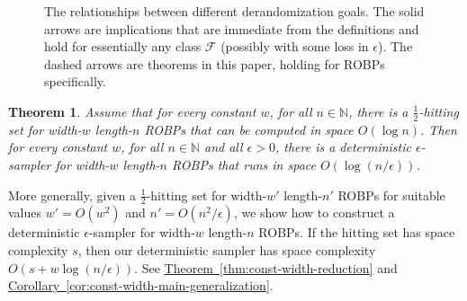 \documentclass[11pt]{article}
\numberwithin{equation}{section}
\newtheorem{theorem}{Theorem}[section]
\theoremstyle{definition}
\theoremstyle{plain}
\newcommand{\N}{\mathbb N}
\newcommand{\expref}[2]{\hyperref[#2]{#1~\ref{#2}}}
\DeclareMathOperator*{\ExpVal}{\mathbb{E}}
\begin{document}
\begin{figure}[h]
\begin{center}

\end{center}

\caption{The relationships between different derandomization goals. The solid arrows are implications that are immediate from the definitions and hold for essentially any class $\mathcal{F}$ (possibly with some loss in $\epsilon$). The dashed arrows are theorems in this paper, holding for ROBPs specifically.} \label{fig:implications}
\end{figure}

\begin{theorem} \label{thm:const-width-main}
Assume that for every constant $w$, for all $n \in \N$, there is a $\frac{1}{2}$-hitting set for width-$w$ length-$n$ ROBPs that can be computed in space $O(\log n)$. Then for every constant $w$, for all $n \in \N$ and all $\epsilon > 0$, there is a deterministic $\epsilon$-sampler for width-$w$ length-$n$ ROBPs that runs in space $O(\log(n/\epsilon))$.
\end{theorem}

More generally, given a $\frac{1}{2}$-hitting set for width-$w'$ length-$n'$ ROBPs for suitable values $w' = O(w^2)$ and $n' = O(n^2/\epsilon)$, we show how to construct a deterministic $\epsilon$-sampler for width-$w$ length-$n$ ROBPs. If the hitting set has space complexity $s$, then our deterministic sampler has space complexity $O(s + w \log(n/\epsilon))$. See \expref{Theorem}{thm:const-width-reduction} and \expref{Corollary}{cor:const-width-main-generalization}.
\end{document}
